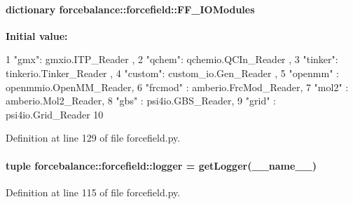 \hypertarget{namespaceforcebalance_1_1forcefield_a7e159bd71671c11d9327e46f2ac01483}{
\paragraph[{\-F\-F\-\_\-\-I\-O\-Modules}]{\setlength{\rightskip}{0pt plus 5cm}dictionary {\bf forcebalance\-::forcefield\-::\-F\-F\-\_\-\-I\-O\-Modules}}}\label{namespaceforcebalance_1_1forcefield_a7e159bd71671c11d9327e46f2ac01483}
{\bfseries \-Initial value\-:}
\begin{DoxyCode}
1 {"gmx": gmxio.ITP_Reader ,
2                 "qchem": qchemio.QCIn_Reader ,
3                 "tinker": tinkerio.Tinker_Reader ,
4                 "custom": custom_io.Gen_Reader , 
5                 "openmm" : openmmio.OpenMM_Reader,
6                 "frcmod" : amberio.FrcMod_Reader,
7                 "mol2" : amberio.Mol2_Reader,
8                 "gbs" : psi4io.GBS_Reader,
9                 "grid" : psi4io.Grid_Reader
10                 }
\end{DoxyCode}


\-Definition at line 129 of file forcefield.\-py.

\hypertarget{namespaceforcebalance_1_1forcefield_acc6d19b93081a5db0b60419be8a27471}{
\paragraph[{logger}]{\setlength{\rightskip}{0pt plus 5cm}tuple {\bf forcebalance\-::forcefield\-::logger} = get\-Logger(\-\_\-\-\_\-name\-\_\-\-\_\-)}}\label{namespaceforcebalance_1_1forcefield_acc6d19b93081a5db0b60419be8a27471}


\-Definition at line 115 of file forcefield.\-py.

